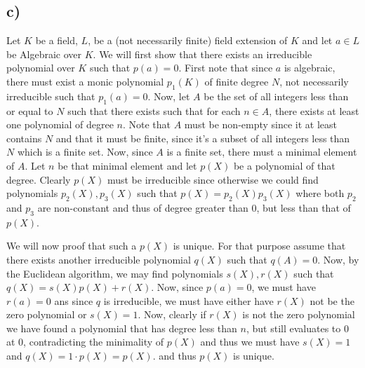 \subsection*{c)}
Let $K$ be a field, $L$, be a (not necessarily finite) field extension of $K$ and let $a\in L$  be Algebraic over $K$. We will first show that there exists an irreducible polynomial over $K$ such that $p(a)=0$. First note that since $a$ is algebraic, there must exist a monic polynomial $p_1(K)$ of finite degree $N$, not necessarily irreducible such that $p_1(a)=0$. Now, let $A$ be the set of all integers less than or equal to $N$ such that there exists such that for each $n\in A$, there exists at least one polynomial of degree $n$. Note that $A$ must be non-empty since it at least contains $N$ and that it must be finite, since it's a subset of all integers less than $N$ which is a finite set. Now, since $A$ is a finite set, there must a minimal element of $A$. Let $n$ be that minimal element and let $p(X)$ be a polynomial of that degree. Clearly $p(X)$ must be irreducible since otherwise we could find polynomials $p_2(X),p_3(X)$ such that $p(X)=p_2(X)p_3(X)$ where both $p_2$ and $p_3$ are non-constant and thus of degree greater than $0$, but less than that of $p(X)$. \par 
We will now proof that such a $p(X)$ is unique. For that purpose assume that there exists another irreducible polynomial $q(X)$ such that $q(A)=0$. Now, by the Euclidean algorithm, we may find polynomials $s(X),r(X)$ such that $q(X)=s(X)p(X)+r(X)$. Now, since  $p(a)=0$, we must have $r(a)=0$ ans since $q$ is irreducible, we must have either have $r(X)$ not be the zero polynomial or $s(X)=1$. Now, clearly if $r(X)$ is not the zero polynomial we have found a polynomial that has degree less than $n$, but still evaluates to $0$ at $0$, contradicting the minimality of $p(X)$ and thus we must have $s(X)=1$ and $q(X)=1\cdot p(X) = p(X)$. and thus $p(X)$ is unique. 
